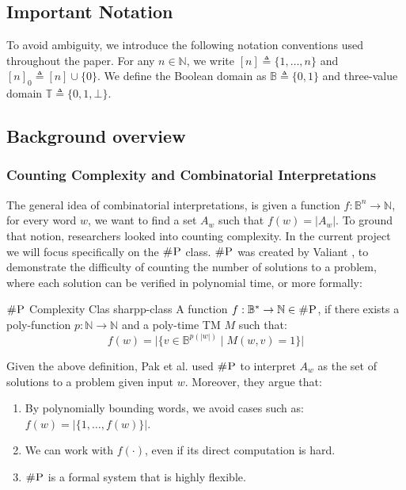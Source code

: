 
\subsection{Important Notation}

To avoid ambiguity, we introduce the following notation conventions used throughout the paper.
For any $n \in \mathbb{N}$, we write $[n] \triangleq \{1, \ldots, n\}$  and $[n]_0 \triangleq [n] \cup \{0\}$. 
We define the Boolean domain as $\mathbb{B} \triangleq \{0, 1\}$ and
three-value domain $\mathbb{T} \triangleq \{0, 1, \bot\}$.


\subsection{Background overview}


\subsubsection{Counting Complexity and Combinatorial Interpretations}

The general idea of combinatorial interpretations, is given a function $f: \mathbb{B}^n \to \mathbb{N}$, 
for every word $w$, we want to find a set $A_w$ such that $f(w)= |A_w|$.
To ground that notion, researchers looked into counting complexity.
In the current project we will focus specifically on the $\textsc{\#P}$ class.
$\textsc{\#P}$ was created by Valiant \cite{valiant_ComplexityComputingPermanent_1979},
to demonstrate the difficulty of counting the number of solutions to a problem,
where each solution can be verified in polynomial time, or more formally:

\begin{definitionbox}{$\textsc{\#P}$ Complexity Clas \cite{valiant_ComplexityComputingPermanent_1979}}{sharpp-class}
    A function $f: \mathbb{B}^* \to \mathbb{N} \in \textsc{\#P}$, if there exists a
    poly-function $p : \mathbb{N} \to \mathbb{N}$ and a poly-time TM $M$ such that:
    $$
    f(w) = \Big|\Big\{v \in \mathbb{B}^{p(|w|)} \mid M(w, v) =1 \Big\}\Big|
    $$
\end{definitionbox}

Given the above definition, Pak et al. \cite{pak_WhatCombinatorialInterpretation_2022, ikenmeyer_PositivitySymmetricGroup_2024}
used $\textsc{\#P}$ to interpret $A_w$ as the set of solutions to a problem given input $w$.
Moreover, they argue that:

\begin{enumerate}
    \item By polynomially bounding words, we avoid cases such as: $f(w) = |\{1, \hdots, f(w)\}|$.
    \item We can work with $f(\cdot)$, even if its direct computation is hard.
    \item $\textsc{\#P}$ is a formal system that is highly flexible.
\end{enumerate}

